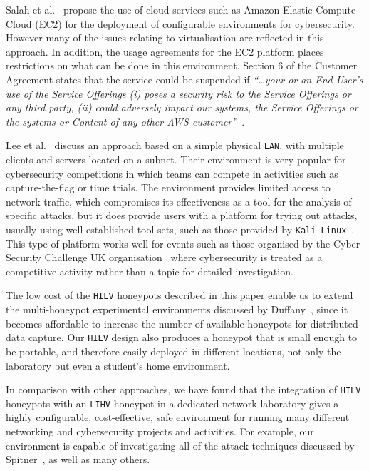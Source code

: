 \documentclass{ieeeaccess}
\begin{document}
Salah et al.~\cite{SHZ:15} propose the use of cloud services such as Amazon
Elastic Compute Cloud (EC2) for the deployment of configurable environments for
cybersecurity. However many of the issues relating to virtualisation are
reflected in this approach. In addition, the usage agreements for the EC2
platform places restrictions on what can be done in this environment. Section 6
of the Customer Agreement states that the service could be suspended if
\textit{``\ldots your or an End User's use of the Service Offerings (i) poses a
security risk to the Service Offerings or any third party, (ii) could adversely
impact our systems, the Service Offerings or the systems or Content of any
other AWS customer''}~\cite{AWS:18}.

Lee et al.~\cite{LUFC:11} discuss an approach based on a simple physical
\texttt{LAN}, with multiple clients and servers located on a subnet.  Their
environment is very popular for cybersecurity competitions in which teams can
compete in activities such as capture-the-flag or time trials. The environment
provides limited access to network traffic, which compromises its effectiveness
as a tool for the analysis of specific attacks, but it does provide users with a
platform for trying out attacks, usually using well established tool-sets, such
as those provided by \texttt{Kali Linux}~\cite{OS:17}. This type of platform
works well for events such as those organised by the Cyber Security Challenge
UK organisation~\cite{CSCUK:18} where cybersecurity is treated as a competitive
activity rather than a topic for detailed investigation.  

The low cost of the \texttt{HILV} honeypots described in this paper enable us
to extend the multi-honeypot experimental environments discussed by
Duffany~\cite{JD:08}, since it becomes affordable to increase the number of
available honeypots for distributed data capture. Our \texttt{HILV} design also
produces a honeypot that is small enough to be portable, and therefore easily
deployed in different locations, not only the laboratory but even a student's
home environment.

In comparison with other approaches, we have found that the integration of
\texttt{HILV} honeypots with an \texttt{LIHV} honeypot in a dedicated network
laboratory gives a highly configurable, cost-effective, safe environment for
running many different networking and cybersecurity projects and activities.
For example, our environment is capable of investigating all of the
attack techniques discussed by Spitner~\cite{LS:03}, as well as many others.
\end{document}
